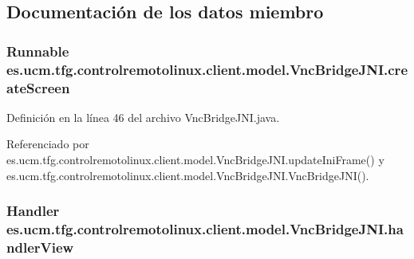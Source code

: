 \subsection{Documentación de los datos miembro}
\hypertarget{classes_1_1ucm_1_1tfg_1_1controlremotolinux_1_1client_1_1model_1_1VncBridgeJNI_a8d14c9f9241ecdb40672f8c76bdb7834}{
\subsubsection[{create\-Screen}]{\setlength{\rightskip}{0pt plus 5cm}Runnable es.\-ucm.\-tfg.\-controlremotolinux.\-client.\-model.\-Vnc\-Bridge\-J\-N\-I.\-create\-Screen\hspace{0.3cm}{\ttfamily [private]}}}\label{classes_1_1ucm_1_1tfg_1_1controlremotolinux_1_1client_1_1model_1_1VncBridgeJNI_a8d14c9f9241ecdb40672f8c76bdb7834}


Definición en la línea 46 del archivo Vnc\-Bridge\-J\-N\-I.\-java.



Referenciado por es.\-ucm.\-tfg.\-controlremotolinux.\-client.\-model.\-Vnc\-Bridge\-J\-N\-I.\-update\-Ini\-Frame() y es.\-ucm.\-tfg.\-controlremotolinux.\-client.\-model.\-Vnc\-Bridge\-J\-N\-I.\-Vnc\-Bridge\-J\-N\-I().

\hypertarget{classes_1_1ucm_1_1tfg_1_1controlremotolinux_1_1client_1_1model_1_1VncBridgeJNI_a456b567b0009e30048be76ccfbedcd0b}{
\subsubsection[{handler\-View}]{\setlength{\rightskip}{0pt plus 5cm}Handler es.\-ucm.\-tfg.\-controlremotolinux.\-client.\-model.\-Vnc\-Bridge\-J\-N\-I.\-handler\-View\hspace{0.3cm}{\ttfamily [private]}}}\label{classes_1_1ucm_1_1tfg_1_1controlremotolinux_1_1client_1_1model_1_1VncBridgeJNI_a456b567b0009e30048be76ccfbedcd0b}


